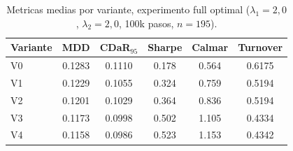 \begin{table}[ht]
  \centering
  \caption{Metricas medias por variante, experimento full optimal ($\lambda_1=2{,}0$, $\lambda_2=2{,}0$, 100k pasos, $n=195$).}
  \label{tab:per_variant_optimal}
  \begin{tabular}{lccccc}
    \toprule
    Variante & MDD & CDaR$_{95}$ & Sharpe & Calmar & Turnover \\
    \midrule
    V0 & 0.1283 & 0.1110 & 0.178 & 0.564 & 0.6175 \\
    V1 & 0.1229 & 0.1055 & 0.324 & 0.759 & 0.5194 \\
    V2 & 0.1201 & 0.1029 & 0.364 & 0.836 & 0.5194 \\
    V3 & 0.1173 & 0.0998 & 0.502 & 1.105 & 0.4334 \\
    V4 & 0.1158 & 0.0986 & 0.523 & 1.153 & 0.4342 \\
    \bottomrule
  \end{tabular}
\end{table}
